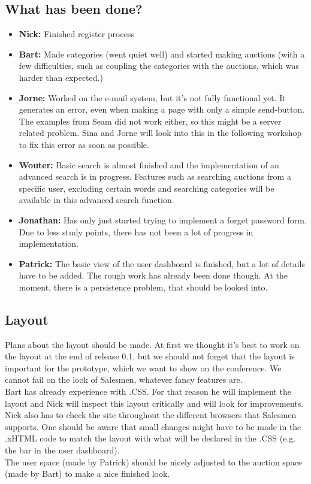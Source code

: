 \documentclass[a4paper, 12pt]{article}
\begin{document}
		\subsection{What has been done?}	
		\begin{itemize} 
			\item \textbf{Nick:} Finished register process
			\item \textbf{Bart:} Made categories (went quiet well) and started making auctions (with a few difficulties, such as coupling the categories with the auctions, which was harder than expected.)
			\item \textbf{Jorne:} Worked on the e-mail system, but it's not fully functional yet. It generates an error, even when making a page with only a simple send-button. The examples from Seam did not work either, so this might be a server related problem.  Sina and Jorne will look into this in the following workshop to fix this error as soon as possible.
			\item \textbf{Wouter:} Basic search is almost finished and the implementation of an advanced search is in progress. Features such as searching auctions from a specific user, excluding certain words and searching categories will be available in this advanced search function.
			\item \textbf{Jonathan:} Has only just started trying to implement a forget password form. Due to less study points, there has not been a lot of progress in implementation. 
			\item \textbf{Patrick:} The basic view of the user dashboard is finished, but a lot of details have to be added. The rough work has already been done though. At the moment, there is a persistence problem, that should be looked into.
		\end{itemize}
		\subsection{Layout} 
Plans about the layout should be made. At first we thought it's best to work on the layout at the end of release 0.1, but we should not forget that the layout is important for the prototype, which we want to show on the conference. We cannot fail on the look of Salesmen, whatever fancy features are. \\
Bart has already experience with .CSS. For that reason he will implement the layout and Nick will inspect this layout critically and will look for improvements. Nick also has to check the site throughout the different browsers that Salesmen supports.
One should be aware that small changes might have to be made in the .xHTML code to match the layout with what will be declared in the .CSS (e.g. the bar in the user dashboard).\\
The user space (made by Patrick) should be nicely adjusted to the auction space (made by Bart) to make a nice finished look.
\end{document}
